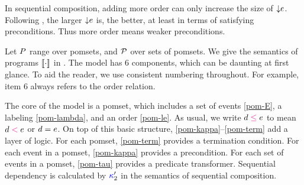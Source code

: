 In sequential composition, adding more order can only increase the size of
${\smash{\downarrow}e}{}$.  Following , the larger
${\smash{\downarrow}e}{}$ is, the better, at least in terms of satisfying
preconditions.  Thus more order means weaker preconditions.


Let $P$ range over pomsets, and $\mathcal{P}$ over sets of pomsets.
We give the semantics of programs $\sembase{}$ in .
%
The model has $6$ components, which can be daunting at first glance.  To aid
the reader, we use consistent numbering throughout. For example, item $6$
always refers to the order relation.

The core of the model is a pomset, which includes a set of events
\eqref{pom-E}, a labeling \eqref{pom-lambda}, and an order \eqref{pom-le}.
As usual, we write $\bEv\le\aEv$ to mean $d\mathrel{{\color{magenta}<}}e$ or $d=e$.
%
On top of this basic structure, \ref{pom-kappa}--\ref{pom-term} add a layer
of logic.  For each pomset, \ref{pom-term} provides a termination condition.
For each event in a pomset, \ref{pom-kappa} provides a precondition.  For
each set of events in a pomset, \ref{pom-tau} provides a predicate
transformer.  Sequential dependency is calculated by ${\color{blue}\kappa}'_2$ in
the semantics of sequential composition.


